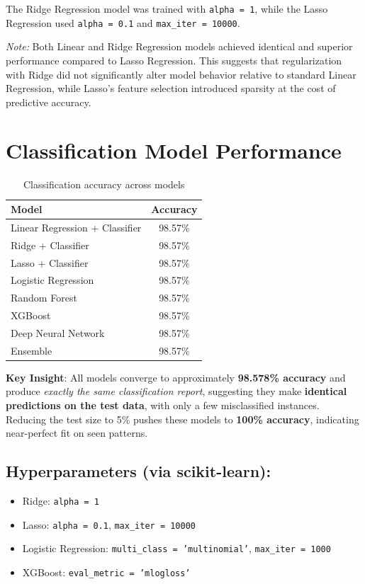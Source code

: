 \documentclass{article}
\begin{document}
The Ridge Regression model was trained with \texttt{alpha = 1}, while the Lasso Regression used \texttt{alpha = 0.1} and \texttt{max\_iter = 10000}.


\noindent
\textit{Note:} Both Linear and Ridge Regression models achieved identical and superior performance compared to Lasso Regression. This suggests that regularization with Ridge did not significantly alter model behavior relative to standard Linear Regression, while Lasso’s feature selection introduced sparsity at the cost of predictive accuracy.

\section{Classification Model Performance}
\begin{table}[H]
\centering
\begin{tabular}{lc}
\toprule
\textbf{Model} & \textbf{Accuracy} \\
\midrule
Linear Regression + Classifier & 98.57\% \\
Ridge + Classifier & 98.57\% \\
Lasso + Classifier & 98.57\% \\
Logistic Regression & 98.57\% \\
Random Forest & 98.57\% \\
XGBoost & 98.57\% \\
Deep Neural Network & 98.57\% \\
Ensemble & 98.57\% \\
\bottomrule
\end{tabular}
\caption{Classification accuracy across models}
\end{table}

\textbf{Key Insight}: All models converge to approximately \textbf{98.578\% accuracy} and produce \textit{exactly the same classification report}, suggesting they make \textbf{identical predictions on the test data}, with only a few misclassified instances. Reducing the test size to 5\% pushes these models to \textbf{100\% accuracy}, indicating near-perfect fit on seen patterns.

\subsection{Hyperparameters (via scikit-learn):}
\begin{itemize}
    \item Ridge: \texttt{alpha = 1}
    \item Lasso: \texttt{alpha = 0.1}, \texttt{max\_iter = 10000}
    \item Logistic Regression: \texttt{multi\_class = 'multinomial'}, \texttt{max\_iter = 1000}
    \item XGBoost: \texttt{eval\_metric = 'mlogloss'}
\end{itemize}
\end{document}
